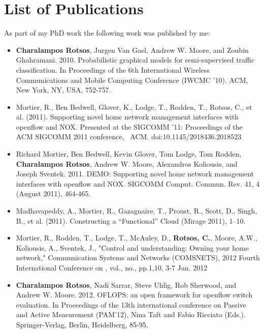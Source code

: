 
\chapter*{List of Publications} \label{sec:intro:pubs}
As part of my PhD work the following work was published by me:
\begin{itemize}
  \item \textbf{Charalampos Rotsos}, Jurgen Van Gael, Andrew W. Moore, and Zoubin
        Ghahramani. 2010. Probabilistic graphical models for semi-supervised
        traffic classification. In Proceedings of the 6th International Wireless
        Communications and Mobile Computing Conference (IWCMC '10). ACM, New
        York, NY, USA, 752-757.
    
  \item Mortier, R., Ben Bedwell, Glover, K., Lodge, T., Rodden, T., Rotsos, C.,
    et al. (2011). Supporting novel home network management interfaces with
    openflow and NOX. Presented at the SIGCOMM '11: Proceedings of the ACM
    SIGCOMM 2011 conference,  ACM. doi:10.1145/2018436.2018523

  \item Richard Mortier, Ben Bedwell, Kevin Glover, Tom Lodge, Tom Rodden,
    \textbf{Charalampos Rotsos}, Andrew W. Moore, Alexandros Koliousis, and Joseph
        Sventek. 2011. DEMO: Supporting novel home network management interfaces with
        openflow and NOX. SIGCOMM Comput. Commun. Rev. 41, 4 (August 2011),
        464-465.

  \item Madhavapeddy, A., Mortier, R., Gazagnaire, T., Proust, R., Scott, D.,
        Singh, B., et al. (2011). Constructing a “Functional” Cloud (Mirage
        2011), 1–10.
 
  \item Mortier, R., Rodden, T., Lodge, T., McAuley, D., \textbf{Rotsos, C.},
        Moore, A.W., Koliousis, A., Sventek, J., "Control and understanding:
        Owning your home network," Communication Systems and Networks
        (COMSNETS), 2012 Fourth International Conference on , vol., no.,
        pp.1,10, 3-7 Jan. 2012
  
  \item \textbf{Charalampos Rotsos}, Nadi Sarrar, Steve Uhlig, Rob Sherwood,
        and Andrew W. Moore. 2012. OFLOPS: an open framework for openflow
        switch evaluation. In Proceedings of the 13th international
        conference on Passive and Active Measurement (PAM'12), Nina Taft and
        Fabio Ricciato (Eds.). Springer-Verlag, Berlin, Heidelberg, 85-95. 


\end{itemize}
